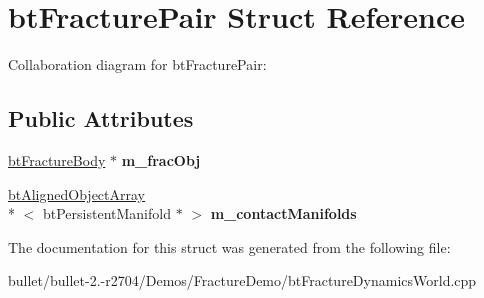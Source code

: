 \hypertarget{structbt_fracture_pair}{\section{bt\+Fracture\+Pair Struct Reference}
\label{structbt_fracture_pair}
}


Collaboration diagram for bt\+Fracture\+Pair\+:
\subsection*{Public Attributes}
\begin{DoxyCompactItemize}
\item 
\hypertarget{structbt_fracture_pair_a279f1230434244435acbfbfd453a9686}{\hyperlink{classbt_fracture_body}{bt\+Fracture\+Body} $\ast$ {\bfseries m\+\_\+frac\+Obj}}\label{structbt_fracture_pair_a279f1230434244435acbfbfd453a9686}

\item 
\hypertarget{structbt_fracture_pair_a588680a5de20bb274d9cce3c9fa80d07}{\hyperlink{classbt_aligned_object_array}{bt\+Aligned\+Object\+Array}\\*
$<$ bt\+Persistent\+Manifold $\ast$ $>$ {\bfseries m\+\_\+contact\+Manifolds}}\label{structbt_fracture_pair_a588680a5de20bb274d9cce3c9fa80d07}

\end{DoxyCompactItemize}


The documentation for this struct was generated from the following file\+:\begin{DoxyCompactItemize}
\item 
bullet/bullet-\/2.-\/r2704/\+Demos/\+Fracture\+Demo/bt\+Fracture\+Dynamics\+World.\+cpp\end{DoxyCompactItemize}
